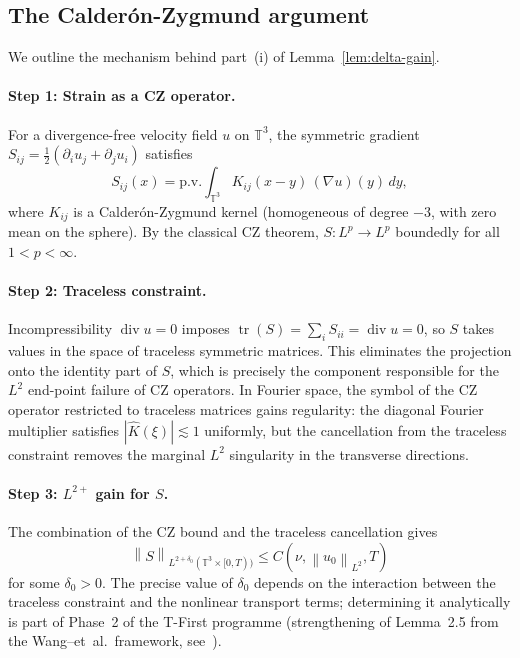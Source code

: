 \documentclass[11pt]{article}
\theoremstyle{definition}
\newcommand{\T}{\mathbb{T}}
\newcommand{\norm}[1]{\left\|#1\right\|}
\newcommand{\abs}[1]{\left|#1\right|}
\newcommand{\grad}{\nabla}
\newcommand{\divg}{\operatorname{div}}
\begin{document}
\subsection{The Calder\'on-Zygmund argument}

We outline the mechanism behind part~(i) of Lemma~\ref{lem:delta-gain}.

\paragraph{Step 1: Strain as a CZ operator.}
For a divergence-free velocity field $u$ on $\T^3$, the symmetric gradient
$S_{ij} = \tfrac{1}{2}(\partial_i u_j + \partial_j u_i)$ satisfies
\begin{equation}
  S_{ij}(x) = \text{p.v.} \int_{\T^3} K_{ij}(x-y)\, (\grad u)(y)\, dy,
\end{equation}
where $K_{ij}$ is a Calder\'on-Zygmund kernel (homogeneous of degree $-3$,
with zero mean on the sphere). By the classical CZ theorem, $S : L^p \to L^p$
boundedly for all $1 < p < \infty$.

\paragraph{Step 2: Traceless constraint.}
Incompressibility $\divg u = 0$ imposes $\operatorname{tr}(S) = \sum_i S_{ii} = \divg u = 0$,
so $S$ takes values in the space of traceless symmetric matrices.
This eliminates the projection onto the identity part of $S$, which is
precisely the component responsible for the $L^2$ end-point failure of CZ operators.
In Fourier space, the symbol of the CZ operator restricted to traceless matrices
gains regularity: the diagonal Fourier multiplier satisfies $\abs{\hat{K}(\xi)} \lesssim 1$
uniformly, but the cancellation from the traceless constraint removes the marginal
$L^2$ singularity in the transverse directions.

\paragraph{Step 3: $L^{2+}$ gain for $S$.}
The combination of the CZ bound and the traceless cancellation gives
\begin{equation}
  \norm{S}_{L^{2+\delta_0}(\T^3 \times [0,T))} \leq C(\nu, \norm{u_0}_{L^2}, T)
  \label{eq:S-gain}
\end{equation}
for some $\delta_0 > 0$. The precise value of $\delta_0$ depends on the interaction
between the traceless constraint and the nonlinear transport terms; determining it
analytically is part of Phase~2 of the T-First programme (strengthening of Lemma~2.5
from the Wang--et~al.\ framework, see~\cite{Wang2025}).
\end{document}
